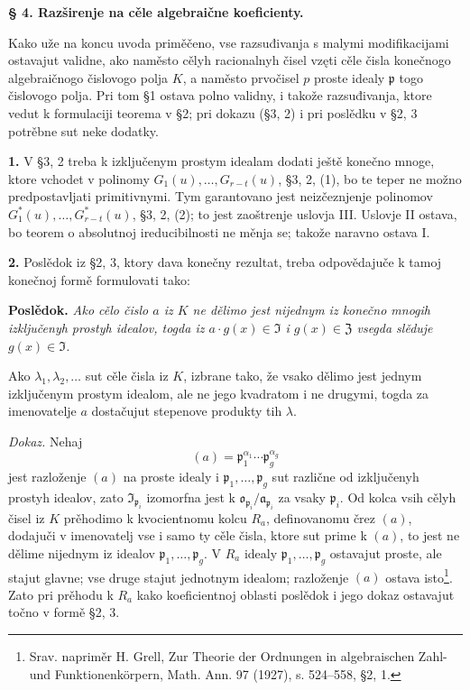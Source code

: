 \documentclass[11pt]{article}
\begin{document}
\bigskip
\noindent\textbf{§ 4. Razširenje na cěle algebraične koeficienty.}

\smallskip
Kako uže na koncu uvoda priměčeno, vse razsuđivanja s malymi modifikacijami ostavajut validne, ako naměsto cělyh racionalnyh čisel vzęti cěle čisla konečnogo algebraičnogo čislovogo polja \(K\), a naměsto prvočisel \(p\) proste idealy \(\mathfrak{p}\) togo čislovogo polja. Pri tom §1 ostava polno validny, i takože razsuđivanja, ktore vedut k formulaciji teorema v §2; pri dokazu (§3, 2) i pri poslědku v §2, 3 potrěbne sut neke dodatky.

\medskip\noindent\textbf{1.}
V §3, 2 treba k izključenym prostym idealam dodati ještě konečno mnoge, ktore vchodet v polinomy \(G_1(u),\ldots,G_{r-t}(u)\), §3, 2, (1), bo te teper ne možno predpostavljati primitivnymi. Tym garantovano jest neizčeznjenje polinomov \(G^*_1(u),\ldots,G^*_{r-t}(u)\), §3, 2, (2); to jest zaoštrenje uslovja III. Uslovje II ostava, bo teorem o absolutnoj ireducibilnosti ne měnja se; takože naravno ostava I.

\medskip\noindent\textbf{2.}
Poslědok iz §2, 3, ktory dava konečny rezultat, treba odpovědajuče k tamoj konečnoj formě formulovati tako:

\noindent\textbf{Poslědok.}
\textit{Ako cělo čislo \(a\) iz \(K\) ne dělimo jest nijednym iz konečno mnogih izključenyh prostyh idealov, togda iz \(a\cdot g(x)\in\mathfrak{I}\) i \(g(x)\in\mathfrak{Z}\) vsegda slěduje \(g(x)\in\mathfrak{I}\).}

Ako \(\lambda_1,\lambda_2,\ldots\) sut cěle čisla iz \(K\), izbrane tako, že vsako dělimo jest jednym izključenym prostym idealom, ale ne jego kvadratom i ne drugymi, togda za imenovatelje \(a\) dostačujut stepenove produkty tih \(\lambda\).

\noindent\textit{Dokaz.}
Nehaj
\[
(a)=\mathfrak{p}_1^{\alpha_1}\cdots\mathfrak{p}_g^{\alpha_g}
\]
jest razloženje \((a)\) na proste idealy i \(\mathfrak{p}_1,\ldots,\mathfrak{p}_g\) sut različne od izključenyh prostyh idealov, zato \(\mathfrak{I}_{\mathfrak{p}_i}\) izomorfna jest k \(\mathfrak{o}_{\mathfrak{p}_i}/\mathfrak{a}_{\mathfrak{p}_i}\) za vsaky \(\mathfrak{p}_i\). Od kolca vsih cělyh čisel iz \(K\) prěhodimo k kvocientnomu kolcu \(R_a\), definovanomu črez \((a)\), dodajuči v imenovatelj vse i samo ty cěle čisla, ktore sut prime k \((a)\), to jest ne dělime nijednym iz idealov \(\mathfrak{p}_1,\ldots,\mathfrak{p}_g\). V \(R_a\) idealy \(\mathfrak{p}_1,\ldots,\mathfrak{p}_g\) ostavajut proste, ale stajut glavne; vse druge stajut jednotnym idealom; razloženje \((a)\) ostava isto\footnote{Srav. napriměr H. Grell, Zur Theorie der Ordnungen in algebraischen Zahl- und Funktionenkörpern, Math. Ann. 97 (1927), s. 524--558, §2, 1.}. Zato pri prěhodu k \(R_a\) kako koeficientnoj oblasti poslědok i jego dokaz ostavajut točno v formě §2, 3.
\end{document}
